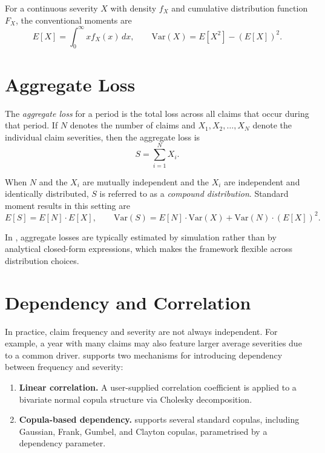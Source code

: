 For a continuous severity $X$ with density $f_X$ and cumulative
distribution function $F_X$, the conventional moments are
\[
    E[X] = \int_0^{\infty} x f_X(x)\, dx, \qquad
    \mathrm{Var}(X) = E[X^2] - (E[X])^{2}.
\]

\section{Aggregate Loss}
\label{sec:aggregate_loss}

The \emph{aggregate loss} for a period is the total loss across all claims
that occur during that period. If $N$ denotes the number of claims and
$X_1, X_2, \dots, X_N$ denote the individual claim severities, then
the aggregate loss is
\[
    S = \sum_{i=1}^{N} X_i.
\]

When $N$ and the $X_i$ are mutually independent and the $X_i$ are
independent and identically distributed, $S$ is referred to as a
\emph{compound distribution}. Standard moment results in this setting
are
\[
    E[S] = E[N] \cdot E[X], \qquad
    \mathrm{Var}(S) = E[N] \cdot \mathrm{Var}(X) + \mathrm{Var}(N) \cdot (E[X])^{2}.
\]

In \actsim, aggregate losses are typically estimated by simulation rather
than by analytical closed-form expressions, which makes the framework
flexible across distribution choices.

\section{Dependency and Correlation}
\label{sec:dependency}

In practice, claim frequency and severity are not always independent. For
example, a year with many claims may also feature larger average severities
due to a common driver. \actsim supports two mechanisms for introducing
dependency between frequency and severity:

\begin{enumerate}[leftmargin=*]
    \item \textbf{Linear correlation.} A user-supplied correlation
          coefficient is applied to a bivariate normal copula structure
          via Cholesky decomposition.
    \item \textbf{Copula-based dependency.} \actsim supports several
          standard copulas, including Gaussian, Frank, Gumbel, and
          Clayton copulas, parametrised by a dependency parameter.
\end{enumerate}

